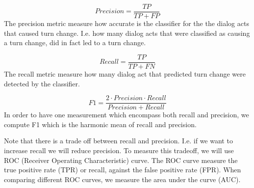 \begin{equation}
Precision = \frac{TP }{TP + FP}
\end{equation}
The precision metric measure how accurate is the classifier for the the dialog acts that caused turn change. I.e. how many dialog acts that were classified as causing a turn change, did in fact led to a turn change.

\begin{equation}
Recall = \frac{TP }{TP + FN}
\end{equation}
The recall metric measure how many dialog act that predicted turn change were detected by the classifier.

\begin{equation}
F1 = \frac{2 \cdot Precision\cdot Recall}{Precision+ Recall}
\end{equation}
In order to have one measurement which encompass both recall and precision, we compute F1 which is the
harmonic mean of recall and precision.

Note that there is a trade off between recall and precision. I.e. if we want to increase recall we will reduce precision. To measure this tradeoff, we will use ROC (Receiver Operating Characteristic) curve.
The ROC curve measure the true positive rate (TPR) or recall, against the false positive rate (FPR).
When comparing different ROC curves, we measure the area under the curve (AUC).

